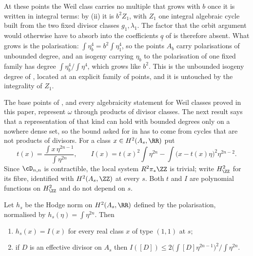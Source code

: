 \begin{remark}\label{rem:quatdivisible}
At these points the Weil class carries no multiple that grows with $b$ once
it is written in integral terms: by (ii) it is
$b^{2}Z_{1}$, with $Z_{1}$ one integral algebraic cycle built from the two
fixed divisor classes $g_{1},\lambda_{1}$. The factor that the orbit argument
would otherwise have to absorb into the coefficients $\underline{q}$ of
 is therefore absent. What grows is the polarisation:
$\int\eta_{b}^{4}=b^{2}\int\eta_{1}^{4}$, so the points $A_{b}$ carry
polarisations of unbounded degree, and an isogeny carrying $\eta_{b}$ to the
polarisation of one fixed family has degree $\int\eta_{b}^{4}/\int\eta^{4}$,
which grows like $b^{2}$. This is the unbounded isogeny degree of
, located at an explicit family of points, and it is
untouched by the integrality of $Z_{1}$.
\end{remark}

The base points of , and every algebraicity statement
for Weil classes proved in this paper, represent $\omega$ through products of
divisor classes. The next result says that a representation of that kind can
hold with bounded degrees only on a nowhere dense set, so the bound asked for
in  has to come from cycles that are not products of
divisors. For a class $x\in H^{2}(A_{s},\RR)$ put
\[
  t(x)=\frac{\int x\,\eta^{2n-1}}{\int\eta^{2n}},\qquad
  I(x)=t(x)^{2}\!\int\eta^{2n}-\int\bigl(x-t(x)\eta\bigr)^{2}\eta^{2n-2}.
\]
Since $\cD_{n,n}$ is contractible, the local system $R^{2}\pi_{*}\ZZ$ is
trivial; write $H^{2}_{\ZZ}$ for its fibre, identified with $H^{2}(A_{s},\ZZ)$
at every $s$. Both $t$ and $I$ are polynomial functions on $H^{2}_{\ZZ}$ and
do not depend on $s$.

\begin{lemma}\label{lem:nefnorm}
Let $h_{s}$ be the Hodge norm on $H^{2}(A_{s},\RR)$ defined by the
polarisation, normalised by $h_{s}(\eta)=\int\eta^{2n}$. Then
\begin{enumerate}[label=\textup{(\roman*)},nosep]
\item $h_{s}(x)=I(x)$ for every real class $x$ of type $(1,1)$ at $s$;
\item if $D$ is an effective divisor on $A_{s}$ then
  $I([D])\le 2\bigl(\int[D]\eta^{2n-1}\bigr)^{2}\big/\!\int\eta^{2n}$.
\end{enumerate}
\end{lemma}

